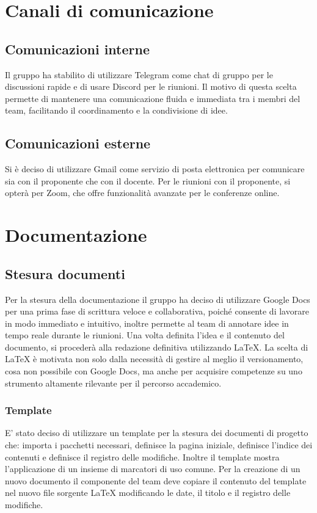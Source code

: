 \documentclass[a4paper, 12pt]{article}
\begin{document}
    \section{Canali di comunicazione}
    \subsection{Comunicazioni interne}
    Il gruppo ha stabilito di utilizzare Telegram come chat di gruppo per le discussioni rapide e di usare Discord per le riunioni. 
    Il motivo di questa scelta permette di mantenere una comunicazione fluida e immediata tra i membri del team, facilitando il coordinamento e la condivisione di idee.
    \subsection{Comunicazioni esterne}
    Si è deciso di utilizzare Gmail come servizio di posta elettronica per comunicare sia con il proponente che con il docente. 
    Per le riunioni con il proponente, si opterà per Zoom, che offre funzionalità avanzate per le conferenze online.

    \section{Documentazione}
    \subsection{Stesura documenti}
    Per la stesura della documentazione il gruppo ha deciso di utilizzare Google Docs per una prima fase di scrittura veloce e collaborativa, poiché consente di lavorare in modo immediato e intuitivo, inoltre permette al team di annotare idee in tempo reale durante le riunioni. Una volta definita l’idea e il contenuto del documento, si procederà alla redazione definitiva utilizzando LaTeX. La scelta di LaTeX è motivata non solo dalla necessità di gestire al meglio il versionamento, cosa non possibile con Google Docs, ma anche per acquisire competenze su uno strumento altamente rilevante per il percorso accademico.
    \subsubsection{Template}
    E’ stato deciso di utilizzare un template per la stesura dei documenti di progetto che: importa i pacchetti necessari, definisce la pagina iniziale, definisce l’indice dei contenuti e definisce il registro delle modifiche.
    Inoltre il template mostra l’applicazione di un insieme di marcatori di uso comune.
    Per la creazione di un nuovo documento il componente del team deve copiare il contenuto del template nel nuovo file sorgente LaTeX modificando le date, il titolo e il registro delle modifiche.
\end{document}
